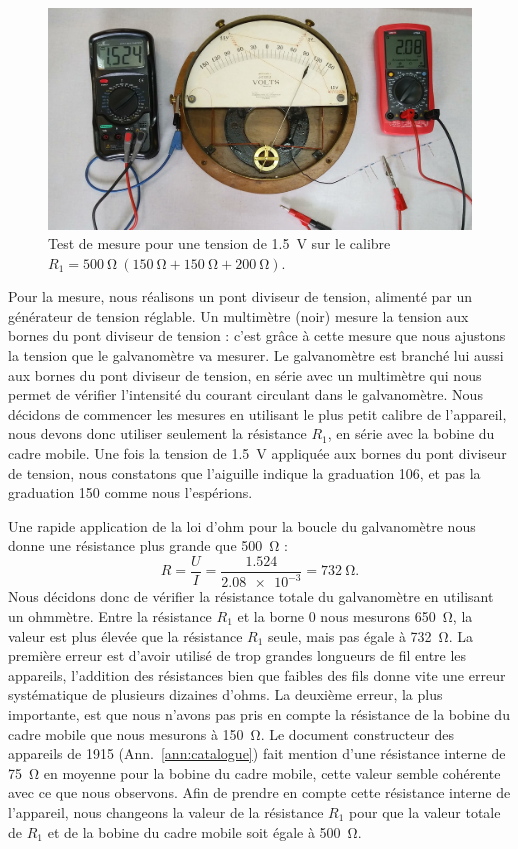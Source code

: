 \documentclass[12pt,a4paper,fleqn]{article}
\begin{document}
\begin{figure}[htbp]
    \center
    \includegraphics[width=\linewidth]{images/20210312_112248.jpg}
    \caption{Test de mesure pour une tension de \qty{1,5}{V} sur le calibre $R_1 = \qty{500}{\ohm}\ (\qty{150}{\ohm} + \qty{150}{\ohm} + \qty{200}{\ohm})$.}
    \label{fig:galva_volt_res}
\end{figure}
Pour la mesure, nous réalisons un pont diviseur de tension, alimenté par un générateur de tension réglable.
Un multimètre (noir) mesure la tension aux bornes du pont diviseur de tension : c'est grâce à cette mesure que nous ajustons la tension que le galvanomètre va mesurer.
Le galvanomètre est branché lui aussi aux bornes du pont diviseur de tension, en série avec un multimètre qui nous permet de vérifier l'intensité du courant circulant dans le galvanomètre.
Nous décidons de commencer les mesures en utilisant le plus petit calibre de l'appareil, nous devons donc utiliser seulement la résistance $R_1$, en série avec la bobine du cadre mobile.
Une fois la tension de \qty{1,5}{V} appliquée aux bornes du pont diviseur de tension, nous constatons que l'aiguille indique la graduation 106, et pas la graduation 150 comme nous l'espérions.

Une rapide application de la loi d'ohm pour la boucle du galvanomètre nous donne une résistance plus grande que \qty{500}{\ohm} :
\[
R = \frac{U}{I} = \frac{\num{1,524}}{\num{2,08e-3}} = \qty{732}{\ohm}.
\]
Nous décidons donc de vérifier la résistance totale du galvanomètre en utilisant un ohmmètre. 
Entre la résistance $R_1$ et la borne 0 nous mesurons \qty{650}{\ohm}, la valeur est plus élevée que la résistance $R_1$ seule, mais pas égale à \qty{732}{\ohm}. 
La première erreur est d'avoir utilisé de trop grandes longueurs de fil entre les appareils, l'addition des résistances bien que faibles des fils donne vite une erreur systématique de plusieurs dizaines d'ohms.
La deuxième erreur, la plus importante, est que nous n'avons pas pris en compte la résistance de la bobine du cadre mobile que nous mesurons à \qty{150}{\ohm}. 
Le document constructeur des appareils de 1915 (Ann.~\ref{ann:catalogue}) fait mention d'une résistance interne de \qty{75}{\ohm} en moyenne pour la bobine du cadre mobile, cette valeur semble cohérente avec ce que nous observons. 
Afin de prendre en compte cette résistance interne de l'appareil, nous changeons la valeur de la résistance $R_1$ pour que la valeur totale de $R_1$ et de la bobine du cadre mobile soit égale à \qty{500}{\ohm}.
\end{document}
